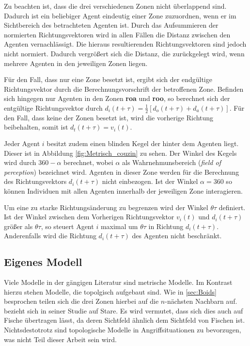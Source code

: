 Zu beachten ist, dass die drei verschiedenen Zonen nicht überlappend sind.
Dadurch ist ein beliebiger Agent eindeutig einer Zone zuzuordnen, wenn er im Sichtbereich des betrachteten Agenten ist.
Durch das Aufsummieren der normierten Richtungsvektoren wird in allen Fällen die Distanz zwischen den Agenten vernachlässigt. Die hieraus resultierenden Richtungsvektoren sind jedoch nicht normiert.
Dadurch vergrößert sich die Distanz, die zurückgelegt wird, wenn mehrere Agenten in den jeweiligen Zonen liegen.

Für den Fall, dass nur eine Zone besetzt ist, ergibt sich der endgültige Richtungsvektor durch die Berechnungsvorschrift der betroffenen Zone. Befinden sich hingegen nur Agenten in den Zonen \textbf{roa} und \textbf{roo}, so berechnet sich der entgültige Richtungsvektor durch $d_i(t+\tau) = \frac{1}{2}[d_o(t+\tau) + d_a(t+\tau)]$. Für den Fall, dass keine der Zonen besetzt ist, wird die vorherige Richtung beibehalten, somit ist $d_t(t+\tau) = v_i(t)$.

Jeder Agent $i$ besitzt zudem einen blinden Kegel der hinter dem Agenten liegt. Dieser ist in Abbildung \ref{fig:Metrisch_couzin} zu sehen. Der Winkel des Kegels wird durch $360 - \alpha$ berechnet, wobei $\alpha$ als Wahrnehmunsbereich (\textit{field of perception}) bezeichnet wird. Agenten in dieser Zone werden für die Berechnung des Richtungsvektors $d_i(t+\tau)$ nicht einbezogen. Ist der Winkel $\alpha = 360$ so können Individuen mit allen Agenten innerhalb der jeweiligen Zone interagieren.

Um eine zu starke Richtungsänderung zu begrenzen wird der Winkel $\theta\tau$ definiert.
Ist der Winkel zwischen dem Vorherigen Richtungsvektor $v_i(t)$ und $d_i(t+\tau)$ größer als $\theta\tau$, so steuert Agent $i$ maximal um $\theta\tau$ in Richtung $d_i(t+\tau)$. Anderenfalls wird die Richtung $d_i(t+\tau)$ des Agenten nicht beschränkt.


\subsection{Eigenes Modell}\label{sec:eigenesModell}

Viele Modelle in der gängigen Literatur sind metrische Modelle. Im Kontrast hierzu stehen Modelle, die topolgisch aufgebaut sind. Wie in \ref{sec:Boids} besprochen teilen sich die drei Zonen hierbei auf die $n$-nächsten Nachbarn auf. \citet{Ballerini} bezieht sich in seiner Studie auf Stare. Es wird vermutet, dass sich dies auch auf Fische übertragen lässt, da deren Sichtfeld ähnlich dem Sichtfeld von Fischen ist. Nichtsdestotrotz sind topologische Modelle in Angriffsituationen zu bevorzugen, was nicht Teil dieser Arbeit sein wird.

